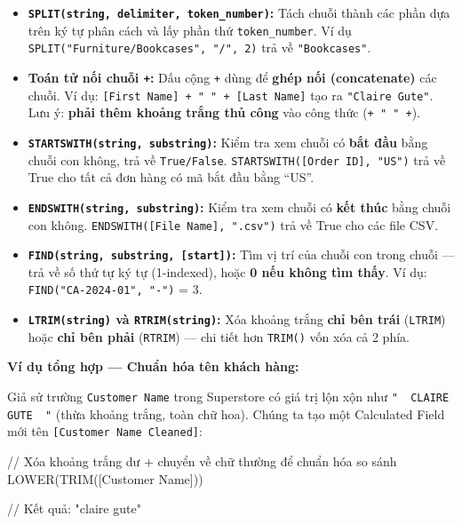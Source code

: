 \documentclass[12pt]{article}
\begin{document}
\begin{itemize}
    \item \textbf{\texttt{SPLIT(string, delimiter, token\_number)}:} Tách chuỗi thành các phần dựa trên ký tự phân cách và lấy phần thứ \texttt{token\_number}. Ví dụ \texttt{SPLIT("Furniture/Bookcases", "/", 2)} trả về \texttt{"Bookcases"}.

    \item \textbf{Toán tử nối chuỗi \texttt{+}:} Dấu cộng \texttt{+} dùng để \textbf{ghép nối (concatenate)} các chuỗi. Ví dụ: \texttt{[First Name] + " " + [Last Name]} tạo ra \texttt{"Claire Gute"}. Lưu ý: \textbf{phải thêm khoảng trắng thủ công} vào công thức (\texttt{+ " " +}).

    \item \textbf{\texttt{STARTSWITH(string, substring)}:} Kiểm tra xem chuỗi có \textbf{bắt đầu} bằng chuỗi con không, trả về \texttt{True/False}. \texttt{STARTSWITH([Order ID], "US")} trả về True cho tất cả đơn hàng có mã bắt đầu bằng ``US''.

    \item \textbf{\texttt{ENDSWITH(string, substring)}:} Kiểm tra xem chuỗi có \textbf{kết thúc} bằng chuỗi con không. \texttt{ENDSWITH([File Name], ".csv")} trả về True cho các file CSV.

    \item \textbf{\texttt{FIND(string, substring, [start])}:} Tìm vị trí của chuỗi con trong chuỗi --- trả về số thứ tự ký tự (1-indexed), hoặc \textbf{0 nếu không tìm thấy}. Ví dụ: \texttt{FIND("CA-2024-01", "-")} = 3.

    \item \textbf{\texttt{LTRIM(string)} và \texttt{RTRIM(string)}:} Xóa khoảng trắng \textbf{chỉ bên trái} (\texttt{LTRIM}) hoặc \textbf{chỉ bên phải} (\texttt{RTRIM}) --- chi tiết hơn \texttt{TRIM()} vốn xóa cả 2 phía.
\end{itemize}

\noindent \textbf{Ví dụ tổng hợp --- Chuẩn hóa tên khách hàng:}

\noindent Giả sử trường \texttt{Customer Name} trong Superstore có giá trị lộn xộn như \texttt{"~~CLAIRE GUTE~~"} (thừa khoảng trắng, toàn chữ hoa). Chúng ta tạo một Calculated Field mới tên \texttt{[Customer Name Cleaned]}:

\begin{aivncodebox}[]
\begin{python}
// Xóa khoảng trắng dư + chuyển về chữ thường để chuẩn hóa so sánh
LOWER(TRIM([Customer Name]))

// Kết quả: "claire gute"
\end{python}
\end{aivncodebox}
\end{document}
